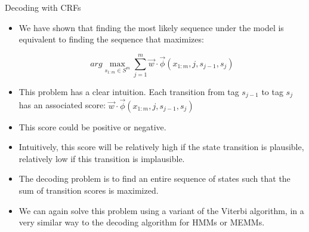 \documentclass[handout]{beamer}
\begin{document}
\begin{frame}{Decoding with CRFs}
\begin{scriptsize}

\begin{itemize}
\item We have shown that finding the most likely sequence under the model is equivalent to finding the sequence that maximizes:

\begin{displaymath}
 arg \max_{s_{1:m} \in S^m}  \sum_{j=1}^{m} \vec{w} \cdot \vec{\phi}(x_{1:m},j,s_{j-1},s_j)  
\end{displaymath}

\item This problem has a clear intuition. Each transition from tag  $s_{j-1}$ to tag $s_j$ has an associated score:  $\vec{w} \cdot \vec{\phi}(x_{1:m},j,s_{j-1},s_j)$  


\item This score could be positive or negative. 

\item Intuitively, this score will be relatively high if the state transition is plausible, relatively low if this transition is implausible.

\item  The decoding problem is to find an entire sequence of states such that the sum of transition scores is maximized.

\item We can again solve this problem using a variant of the Viterbi algorithm, in a very similar way to the decoding algorithm for HMMs or MEMMs.

\end{itemize}


\end{scriptsize}
\end{frame}
\end{document}
